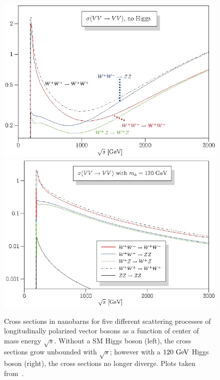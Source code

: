\begin{figure}[htbp]
  \centering
  \includegraphics[height=.25\textheight]{figs/ssww_13tev/introduction/vbs_xsec_nohiggs}
  \includegraphics[height=.25\textheight]{figs/ssww_13tev/introduction/vbs_xsec_higgs120}
 
  \caption[Cross sections in nanobarns for five different scattering processes of longitudinally polarized vector bosons as a function of center of mass energy $\sqrt{s}$.  Without a SM Higgs boson (left), the cross sections grow unbounded with $\sqrt{s}$; however with a $120\gev$ Higgs boson (right), the cross sections no longer diverge.]{Cross sections in nanobarns for five different scattering processes of longitudinally polarized vector bosons as a function of center of mass energy $\sqrt{s}$.  Without a SM Higgs boson (left), the cross sections grow unbounded with $\sqrt{s}$; however with a $120\gev$ Higgs boson (right), the cross sections no longer diverge.  Plots taken from~\cite{2008.vbs-resonances-unitarity}.}
  \label{fig:ssww13tev_vbs_xsec_higgs}
\end{figure}

